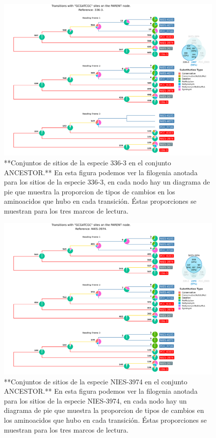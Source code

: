 \documentclass[
]{book}
\begin{document}
\begin{figure}

{\centering \includegraphics[width=1.2\linewidth]{Clados/Calothrix_B/figures/A/GCGATCGC/Ancestor/336-3_Ancestor_A_tree} 

}

\caption{**Conjuntos de sitios de la especie 336-3 en el conjunto ANCESTOR.** En esta figura podemos ver la filogenia anotada para los sitios de la especie 336-3, en cada nodo hay un diagrama de pie que muestra la proporcion de tipos de cambios en los aminoacidos que hubo en cada transición. Éstas proporciones se muestran para los tres marcos de lectura.}\label{fig:FIG5}
\end{figure}

\begin{figure}

{\centering \includegraphics[width=1.2\linewidth]{Clados/Calothrix_B/figures/A/GCGATCGC/Ancestor/NIES-3974_Ancestor_A_tree} 

}

\caption{**Conjuntos de sitios de la especie NIES-3974 en el conjunto ANCESTOR.** En esta figura podemos ver la filogenia anotada para los sitios de la especie NIES-3974, en cada nodo hay un diagrama de pie que muestra la proporcion de tipos de cambios en los aminoacidos que hubo en cada transición. Éstas proporciones se muestran para los tres marcos de lectura.}\label{fig:FIG6}
\end{figure}
\end{document}
